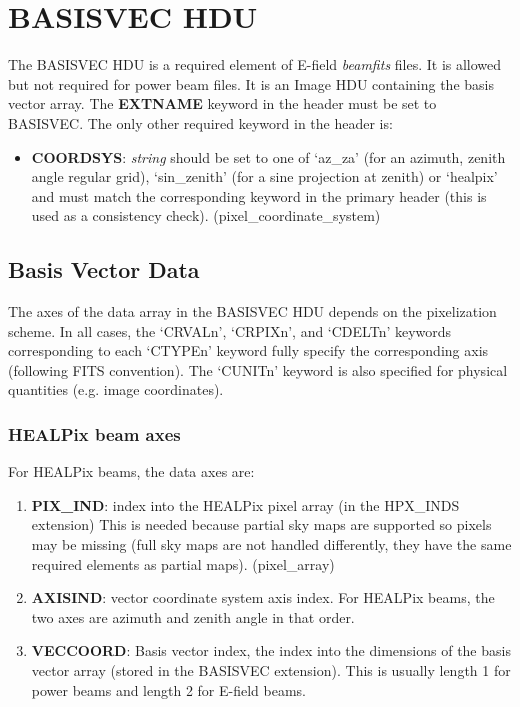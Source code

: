 \documentclass[11pt, oneside]{article}   	%
\begin{document}
\section{BASISVEC HDU}
The BASISVEC HDU is a required element of E-field \textit{beamfits} files. It is allowed but not required for power beam files. It is an Image HDU containing the basis vector array.
The \textbf{EXTNAME} keyword in the header must be set to BASISVEC. The only other required keyword in the header is:

\begin{itemize}
\item{\textbf{COORDSYS}: \textit{string} should be set to one of `az\_za' (for an azimuth, zenith angle regular grid), `sin\_zenith' (for a sine projection at zenith) or `healpix' and must match the corresponding keyword in the primary header (this is used as a consistency check). (pixel\_coordinate\_system)}
\end{itemize}

\subsection{Basis Vector Data}
The axes of the data array in the BASISVEC HDU depends on the pixelization scheme. In all cases, the `CRVALn', `CRPIXn', and `CDELTn' keywords corresponding to each `CTYPEn' keyword fully specify the corresponding axis (following FITS convention). The `CUNITn' keyword is also specified for physical quantities (e.g. image coordinates).

\subsubsection{HEALPix beam axes}
For HEALPix beams, the data axes are: 
\begin{enumerate}
\item{\textbf{PIX\_IND}: index into the HEALPix pixel array (in the HPX\_INDS extension) This is needed because partial sky maps are supported so pixels may be missing (full sky maps are not handled differently, they have the same required elements as partial maps). (pixel\_array)}
\item{\textbf{AXISIND}: vector coordinate system axis index. For HEALPix beams, the two axes are azimuth and zenith angle in that order.}
\item{\textbf{VECCOORD}: Basis vector index, the index into the dimensions of the basis vector array (stored in the BASISVEC extension). This is usually length 1 for power beams and length 2 for E-field beams.}
\end{enumerate}
\end{document}
